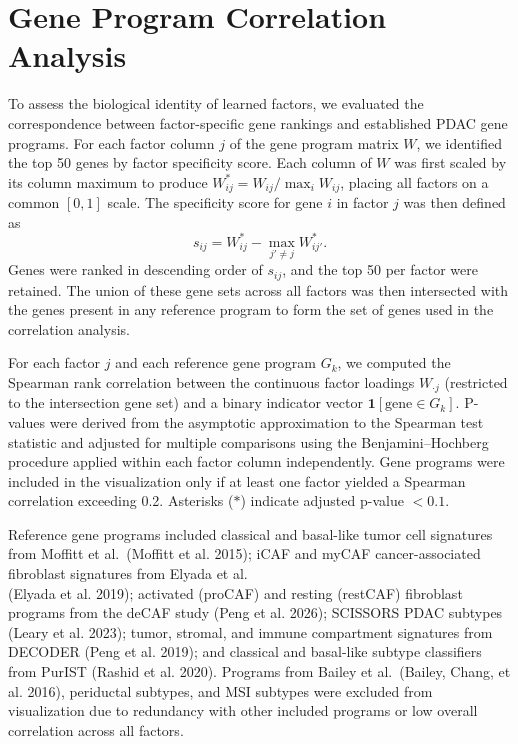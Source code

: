 \documentclass[
]{article}
\begin{document}
\section{Gene Program Correlation Analysis}

To assess the biological identity of learned factors, we evaluated the
correspondence between factor-specific gene rankings and established
PDAC gene programs. For each factor column \(j\) of the gene program
matrix \(W\), we identified the top 50 genes by factor specificity
score. Each column of \(W\) was first scaled by its column maximum to
produce \(W^*_{ij} = W_{ij} /
\max_i W_{ij}\), placing all factors on a common \([0,1]\) scale. The
specificity score for gene \(i\) in factor \(j\) was then defined as
\[s_{ij} = W^*_{ij} - \max_{j' \neq j} W^*_{ij'}.\] Genes were ranked in
descending order of \(s_{ij}\), and the top 50 per factor were retained.
The union of these gene sets across all factors was then intersected
with the genes present in any reference program to form the set of genes
used in the correlation analysis.

For each factor \(j\) and each reference gene program \(G_k\), we
computed the Spearman rank correlation between the continuous factor
loadings \(W_{\cdot j}\) (restricted to the intersection gene set) and a
binary indicator vector \(\mathbf{1}[\text{gene} \in G_k]\). P-values
were derived from the asymptotic approximation to the Spearman test
statistic and adjusted for multiple comparisons using the
Benjamini--Hochberg procedure applied within each factor column
independently. Gene programs were included in the visualization only if
at least one factor yielded a Spearman correlation exceeding 0.2.
Asterisks (\(*\)) indicate adjusted p-value \(< 0.1\).

Reference gene programs included classical and basal-like tumor cell
signatures from Moffitt et al.~(Moffitt et al. 2015); iCAF and myCAF
cancer-associated fibroblast signatures from Elyada et al.\\
(Elyada et al. 2019); activated (proCAF) and resting (restCAF)
fibroblast programs from the deCAF study (Peng et al. 2026); SCISSORS
PDAC subtypes (Leary et al. 2023); tumor, stromal, and immune
compartment signatures from DECODER (Peng et al. 2019); and classical
and basal-like subtype classifiers from PurIST (Rashid et al. 2020).
Programs from Bailey et al.~(Bailey, Chang, et al. 2016), periductal
subtypes, and MSI subtypes were excluded from visualization due to
redundancy with other included programs or low overall correlation
across all factors.
\end{document}
